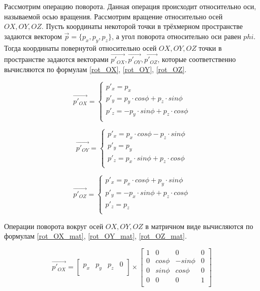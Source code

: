 Рассмотрим операцию поворота. Данная операция происходит относительно оси, называемой осью вращения. Рассмотрим вращение относительно осей $OX, OY, OZ$. Пусть координаты некоторой точки в трёхмерном пространстве задаются вектором $\overrightarrow{p} = \{p_{x}, p_{y}, p_{z}\}$, а угол поворота относительно оси равен $phi$.
Тогда координаты повернутой относительно осей $OX, OY, OZ$ точки в пространстве задаются векторами $\overrightarrow{p'_{OX}}, \overrightarrow{p'_{OY}}, \overrightarrow{p'_{OZ}}$, которые соответственно вычисляются по формулам \ref{rot_OX}, \ref{rot_OY}, \ref{rot_OZ}.

\begin{equation}\label{rot_OX} 
\overrightarrow{p'_{OX}} = 
\begin{cases}
p'_{x} = p_{x}\\
p'_{y} = p_{y} \cdot cos \phi + p_{z} \cdot sin \phi\\
p'_{z} = -p_{y} \cdot sin \phi + p_{z} \cdot cos \phi\\
\end{cases}
\end{equation}

\begin{equation}\label{rot_OY} 
\overrightarrow{p'_{OY}} = 
\begin{cases}
p'_{x} = p_{x} \cdot cos \phi - p_{z} \cdot sin \phi\\
p'_{y} = p_{y}\\
p'_{z} = p_{x} \cdot sin \phi + p_{z} \cdot cos \phi\\
\end{cases}
\end{equation}

\begin{equation}\label{rot_OZ} 
\overrightarrow{p'_{OZ}} = 
\begin{cases}
p'_{x} = p_{x} \cdot cos \phi + p_{y} \cdot sin \phi\\
p'_{y} = -p_{x} \cdot sin \phi + p_{z} \cdot cos \phi\\
p'_{z} = p_{z}\\
\end{cases}
\end{equation}

Операции поворота вокруг осей $OX, OY, OZ$ в матричном виде вычисляются по формулам \ref{rot_OX_mat},  \ref{rot_OY_mat},  \ref{rot_OZ_mat}.

\begin{equation}\label{rot_OX_mat} 
\overrightarrow{p'_{OX}} = 
\begin{bmatrix}
p_{x} & p_{y} & p_{z} & 0\\
\end{bmatrix}
\times
\begin{bmatrix}
1 & 0 & 0 & 0\\
0 & cos \phi & -sin \phi & 0\\
0 & sin \phi & cos \phi & 0\\
0 & 0 & 0 & 1\\
\end{bmatrix}
\end{equation}

